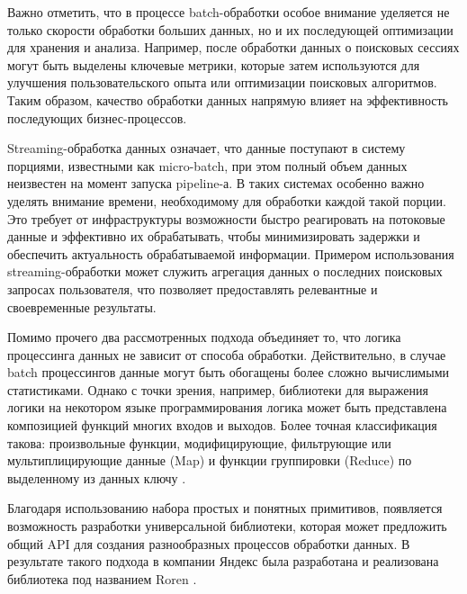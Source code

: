 Важно отметить, что в процессе batch-обработки особое внимание уделяется не только скорости обработки больших данных, но и их последующей оптимизации для хранения и анализа. Например, после обработки данных о поисковых сессиях могут быть выделены ключевые метрики, которые затем используются для улучшения пользовательского опыта или оптимизации поисковых алгоритмов. Таким образом, качество обработки данных напрямую влияет на эффективность последующих бизнес-процессов.

Streaming-обработка данных означает, что данные поступают в систему порциями, известными как micro-batch, при этом полный объем данных неизвестен на момент запуска pipeline-а. В таких системах особенно важно уделять внимание времени, необходимому для обработки каждой такой порции. Это требует от инфраструктуры возможности быстро реагировать на потоковые данные и эффективно их обрабатывать, чтобы минимизировать задержки и обеспечить актуальность обрабатываемой информации. Примером использования streaming-обработки может служить агрегация данных о последних поисковых запросах пользователя, что позволяет предоставлять релевантные и своевременные результаты.

Помимо прочего два рассмотренных подхода объединяет то, что логика процессинга данных не зависит от способа обработки. Действительно, в случае batch процессингов данные могут быть обогащены более сложно вычислимыми статистиками. Однако с точки зрения, например, библиотеки для выражения логики на некотором языке программирования логика может быть представлена композицией функций многих входов и выходов. Более точная классификация такова: произвольные функции, модифицирующие, фильтрующие или мультиплицирующие данные (Map) и функции группировки (Reduce) по выделенному из данных ключу \cite{mapreduce}.

Благодаря использованию набора простых и понятных примитивов, появляется возможность разработки универсальной библиотеки, которая может предложить общий API для создания разнообразных процессов обработки данных. В результате такого подхода в компании Яндекс была разработана и реализована библиотека под названием Roren \cite{roren}.

\newpage


\newpage


\newpage

